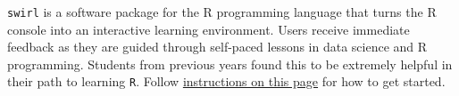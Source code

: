 \documentclass[letterpaper,12pt,twoside,]{pinp}
\begin{document}
\texttt{swirl} is a software package for the R programming language that
turns the R console into an interactive learning environment. Users
receive immediate feedback as they are guided through self-paced lessons
in data science and R programming. Students from previous years found
this to be extremely helpful in their path to learning \texttt{R}.
Follow \href{https://swirlstats.com/students.html}{instructions on this
page} for how to get started.

\end{document}

